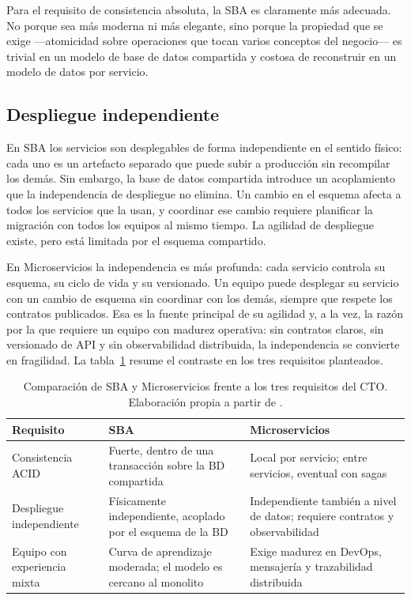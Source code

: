 Para el requisito de consistencia absoluta, la SBA es claramente más adecuada. No porque sea más moderna ni más elegante, sino porque la propiedad que se exige ---atomicidad sobre operaciones que tocan varios conceptos del negocio--- es trivial en un modelo de base de datos compartida y costosa de reconstruir en un modelo de datos por servicio.

\subsection{Despliegue independiente}
En SBA los servicios son desplegables de forma independiente en el sentido físico: cada uno es un artefacto separado que puede subir a producción sin recompilar los demás. Sin embargo, la base de datos compartida introduce un acoplamiento que la independencia de despliegue no elimina. Un cambio en el esquema afecta a todos los servicios que la usan, y coordinar ese cambio requiere planificar la migración con todos los equipos al mismo tiempo. La agilidad de despliegue existe, pero está limitada por el esquema compartido.

En Microservicios la independencia es más profunda: cada servicio controla su esquema, su ciclo de vida y su versionado. Un equipo puede desplegar su servicio con un cambio de esquema sin coordinar con los demás, siempre que respete los contratos publicados. Esa es la fuente principal de su agilidad y, a la vez, la razón por la que requiere un equipo con madurez operativa: sin contratos claros, sin versionado de API y sin observabilidad distribuida, la independencia se convierte en fragilidad. La tabla~\ref{tab:sba-micro} resume el contraste en los tres requisitos planteados.

\begin{table}[H]
  \centering
  \begin{tabular}{@{}p{3.2cm}p{4.6cm}p{4.6cm}@{}}
    \toprule
    \textbf{Requisito} & \textbf{SBA} & \textbf{Microservicios} \\
    \midrule
    Consistencia ACID & Fuerte, dentro de una transacción sobre la BD compartida & Local por servicio; entre servicios, eventual con sagas \\
    \addlinespace
    Despliegue independiente & Físicamente independiente, acoplado por el esquema de la BD & Independiente también a nivel de datos; requiere contratos y observabilidad \\
    \addlinespace
    Equipo con experiencia mixta & Curva de aprendizaje moderada; el modelo es cercano al monolito & Exige madurez en DevOps, mensajería y trazabilidad distribuida \\
    \bottomrule
  \end{tabular}
  \caption{Comparación de SBA y Microservicios frente a los tres requisitos del CTO. Elaboración propia a partir de \parencite{richards2020fundamentals}.}
  \label{tab:sba-micro}
\end{table}

